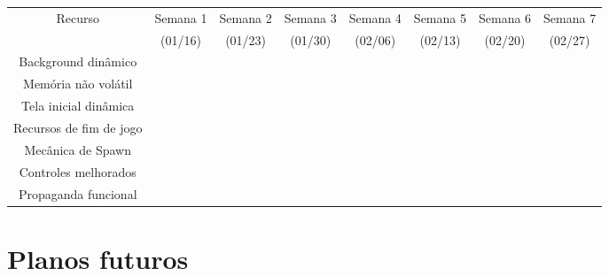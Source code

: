 \newpage

\begin{adjustbox}{width = \textwidth, caption = {Planejamento escalonado}, nofloat=table, center, angle=90}
        \begin{tabular}{|cccccccc|}
            \cline{1-8}
            \multicolumn{1}{|c|}{Recurso} & \multicolumn{1}{c|}{Semana 1} & \multicolumn{1}{c|}{Semana 2} & \multicolumn{1}{c|}{Semana 3} & \multicolumn{1}{c|}{Semana 4} & \multicolumn{1}{c|}{Semana 5} & \multicolumn{1}{c|}{Semana 6} & Semana 7 \\
            \multicolumn{1}{|c|}{} & \multicolumn{1}{c|}{(01/16)} & \multicolumn{1}{c|}{(01/23)} & \multicolumn{1}{c|}{(01/30)} & \multicolumn{1}{c|}{(02/06)} & \multicolumn{1}{c|}{(02/13)} & \multicolumn{1}{c|}{(02/20)} & (02/27) \\ 
            \cline{1-8} 
            Background dinâmico & & & & & & & \\
            Memória não volátil & & & & & & & \\
            Tela inicial dinâmica & & & & & & & \\
            Recursos de fim de jogo & & & & & & & \\
            Mecânica de Spawn & & & & & & & \\
            Controles melhorados & & & & & & & \\
            Propaganda funcional & & & & & & & \\ \cline{1-8}
        \end{tabular}
\end{adjustbox}

    
\chapter{Planos futuros}



% 
% 




